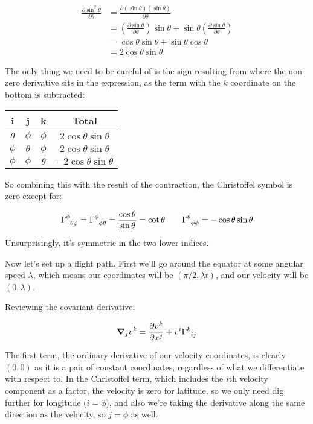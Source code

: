\begin{equation}
    \begin{split}
        \frac{\partial \sin^2 \theta}{\partial \theta}
        &= \frac{\partial (\sin \theta)(\sin \theta)}{\partial \theta} \\
        &= \left(\frac{\partial \sin \theta}{\partial \theta}\right) \sin \theta
        + \sin \theta \left(\frac{\partial \sin \theta}{\partial \theta}\right) \\
        &= \cos \theta \sin \theta + \sin \theta \cos \theta \\
        &= 2\cos\theta\sin\theta            
    \end{split}
\end{equation}

The only thing we need to be careful of is the sign resulting from where the non-zero derivative sits in the expression, as the term with the $k$ coordinate on the bottom is subtracted:

\begin{center}
    \begin{tabular}{ c|c|c|c }
        i & j & k & Total \\
        \hline
        $\theta$ & $\phi$ & $\phi$ & $2\cos\theta\sin\theta$ \\
        $\phi$ & $\theta$ & $\phi$ & $2\cos\theta\sin\theta$ \\
        $\phi$ & $\phi$ & $\theta$ & $-2\cos\theta\sin\theta$         
    \end{tabular}
\end{center}

So combining this with the result of the contraction, the Christoffel symbol is zero except for:

$$
\Gamma\indices{^\phi_\theta_\phi}
= \Gamma\indices{^\phi_\phi_\theta}
= \frac{\cos \theta}{\sin \theta}
= \cot \theta
\quad
\quad
\Gamma\indices{^\theta_\phi_\phi} = -\cos\theta\sin\theta
$$

Unsurprisingly, it's symmetric in the two lower indices.

Now let's set up a flight path. First we'll go around the equator at some angular speed $\lambda$, which means our coordinates will be $(\pi / 2, \lambda t)$, and our velocity will be $(0, \lambda)$.

Reviewing the covariant derivative:

$$
\grad_j v^k
= 
\frac{\partial v^k}{\partial x^j}
+ v^i \Gamma\indices{^k_i_j}
$$

The first term, the ordinary derivative of our velocity coordinates, is clearly $(0, 0)$ as it is a pair of constant coordinates, regardless of what we differentiate with respect to. In the Christoffel term, which includes the $i$th velocity component as a factor, the velocity is zero for latitude, so we only need dig further for longitude ($i=\phi$), and also we're taking the derivative along the same direction as the velocity, so $j=\phi$ as well.

